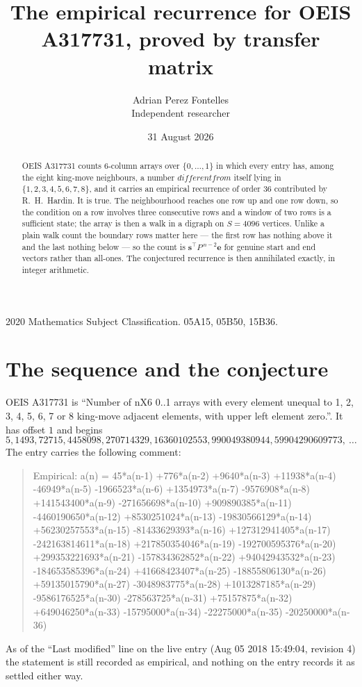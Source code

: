 \documentclass[11pt,a4paper]{article}
\title{The empirical recurrence for OEIS A317731, proved by transfer matrix}
\author{Adrian Perez Fontelles\\ \small Independent researcher}
\date{31 August 2026}
\theoremstyle{plain}
\theoremstyle{definition}
\begin{document}
\maketitle

\begin{abstract}
OEIS A317731 counts $6$-column arrays over $\{0,\dots,1\}$ in which every entry has,
among the eight king-move neighbours, a number $different from$ itself lying in $\{1,2,3,4,5,6,7,8\}$, and it carries an empirical
recurrence of order $36$ contributed by R.~H.~Hardin. It is true. The neighbourhood
reaches one row up and one row down, so the condition on a row involves three consecutive
rows and a window of two rows is a sufficient state; the array is then a walk in a digraph
on $S=4096$ vertices. Unlike a plain walk count the boundary rows matter here --- the first
row has nothing above it and the last nothing below --- so the count is
$\mathbf{s}^{\!\top}P^{\,n-2}\mathbf{e}$ for genuine start and end vectors rather than
all-ones. The conjectured recurrence is then annihilated exactly, in integer arithmetic.
\end{abstract}

\noindent\small 2020 Mathematics Subject Classification. 05A15, 05B50, 15B36.\normalsize

\section{The sequence and the conjecture}

OEIS A317731 is ``Number of nX6 0..1 arrays with every element unequal to 1, 2, 3, 4, 5, 6, 7 or 8 king-move adjacent elements, with upper left element zero.''. It has offset
$1$ and begins
\[
5, 1493, 72715, 4458098, 270714329, 16360102553, 990049380944, 59904290609773,\ \dots
\]
The entry carries the following comment:
\begin{quote}\small
Empirical: a(n) = 45*a(n-1) +776*a(n-2) +9640*a(n-3) +11938*a(n-4) -46949*a(n-5) -1966523*a(n-6) +1354973*a(n-7) -9576908*a(n-8) +141543400*a(n-9) -271656698*a(n-10) +909890385*a(n-11) -4460190650*a(n-12) +8530251024*a(n-13) -19830566129*a(n-14) +56230257553*a(n-15) -81433629393*a(n-16) +127312941405*a(n-17) -242163814611*a(n-18) +217850354046*a(n-19) -192700595376*a(n-20) +299353221693*a(n-21) -157834362852*a(n-22) +94042943532*a(n-23) -184653585396*a(n-24) +41668423407*a(n-25) -18855806130*a(n-26) +59135015790*a(n-27) -3048983775*a(n-28) +1013287185*a(n-29) -9586176525*a(n-30) -278563725*a(n-31) +75157875*a(n-32) +649046250*a(n-33) -15795000*a(n-34) -22275000*a(n-35) -20250000*a(n-36)
\end{quote}
As of the ``Last modified'' line on the live entry (Aug 05 2018 15:49:04, revision
4) the statement is still recorded as empirical, and nothing on the entry
records it as settled either way.
\end{document}
